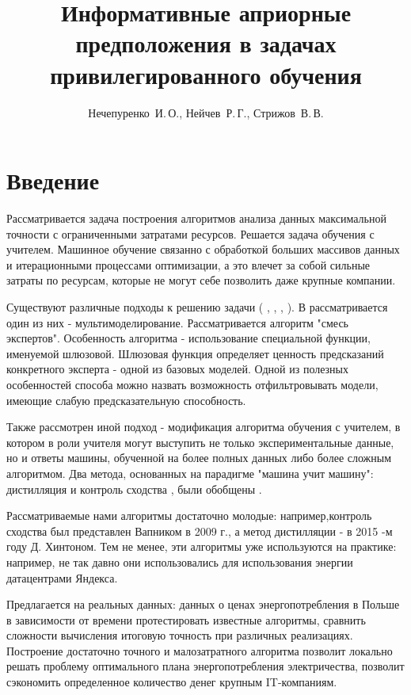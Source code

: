 \documentclass[12pt,twoside]{article}
\title
    [Образец оформления статьи для публикации] %
    {Информативные априорные предположения в задачах
привилегированного обучения}
\author
    [Нечепуренко~И.\,О.] %
    {Нечепуренко~И.\,О., Нейчев~Р.\,Г., Стрижов~В.\,В.} %
    [Нечепуренко~И.\,О.$^1$, Нейчев~Р.\,Г.$^2$, Стрижов~В.\,В.$^2$] %
\begin{document}
\maketitle
\section{Введение}

Рассматривается задача построения алгоритмов анализа данных максимальной точности с ограниченными затратами ресурсов. Решается задача обучения с учителем. Машинное обучение связанно с обработкой больших массивов данных и итерационными процессами оптимизации, а это влечет за собой сильные затраты по ресурсам, которые не могут себе позволить даже крупные компании. 

Существуют различные подходы к решению задачи ( \cite{d}, \cite{c}, \cite{b}, \cite{a}). В \cite{b} рассматривается один из них - мультимоделирование. Рассматривается  \cite{a}  алгоритм "смесь экспертов". Особенность алгоритма - использование специальной функции, именуемой шлюзовой. Шлюзовая функция определяет ценность предсказаний конкретного эксперта - одной из базовых моделей. Одной из полезных особенностей способа можно назвать возможность отфильтровывать модели, имеющие слабую предсказательную способность. 

Также рассмотрен иной подход - модификация алгоритма обучения с учителем, в котором в роли учителя могут выступить не только экспериментальные данные, но и ответы машины, обученной на более полных данных либо более сложным алгоритмом.
Два метода, основанных на парадигме "машина учит машину":  дистилляция \cite{b}  и контроль сходства \cite{c} , были обобщены \cite{d} .

Рассматриваемые нами алгоритмы достаточно молодые: например,контроль сходства был представлен Вапником в 2009 г., а метод дистилляции - в 2015 -м году Д. Хинтоном.  Тем не менее, эти алгоритмы уже используются на практике: например, не так давно они использовались для использования энергии датацентрами Яндекса. 

Предлагается на реальных данных: данных о ценах энергопотребления в Польше в зависимости от времени протестировать известные алгоритмы, сравнить сложности вычисления итоговую точность при различных  реализациях. Построение достаточно точного и малозатратного алгоритма позволит локально решать проблему оптимального плана энергопотребления электричества, позволит сэкономить определенное количество денег крупным IT-компаниям.
\end{document}
